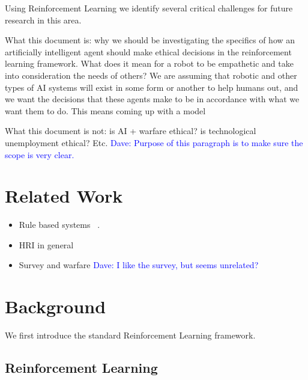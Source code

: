 \documentclass[11pt]{article}
\newcommand\davenote[1]{\textcolor{blue}{Dave: #1}}
\begin{document}
Using Reinforcement Learning we identify several critical challenges for future research in this area.

What this document is: why we should be investigating the specifics of how an artificially intelligent agent should make ethical decisions in the reinforcement learning framework. What does it mean for a robot to be empathetic and take into consideration the needs of others? We are assuming that robotic and other types of AI systems will exist in some form or another to help humans out, and we want the decisions that these agents make to be in accordance with what we want them to do. This means coming up with a model 

What this document is not: is AI + warfare ethical? is technological unemployment ethical? Etc. \davenote{Purpose of this paragraph is to make sure the scope is very clear.}


\section{Related Work}

\begin{itemize}
\item Rule based systems ~\cite{briggs2015sorry}. 
\item HRI in general~\cite{scheutz2007first,tellex2011understanding}
\item Survey and warfare \davenote{I like the survey, but seems unrelated?}
\end{itemize}


\section{Background}

We first introduce the standard Reinforcement Learning framework.


\subsection{Reinforcement Learning}
\end{document}
